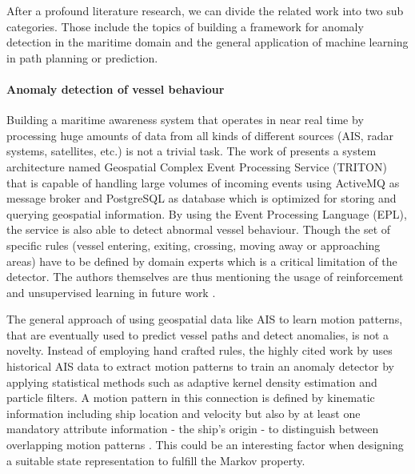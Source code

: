 After a profound literature research, we can divide the related work into two sub categories. Those include the topics of building a framework for anomaly detection in the maritime domain and the general application of machine learning in path planning or prediction.

\par 
\paragraph{Anomaly detection of vessel behaviour}
Building a maritime awareness system that operates in near real time by processing huge amounts of data from all kinds of different sources (AIS, radar systems, satellites, etc.) is not a trivial task. The work of \cite{tsogas2019geospatial} presents a system architecture named Geospatial Complex Event Processing Service (TRITON) that is capable of handling large volumes of incoming events using ActiveMQ as message broker and PostgreSQL as database which is optimized for storing and querying geospatial information. By using the Event Processing Language (EPL), the service is also able to detect abnormal vessel behaviour. Though the set of specific rules (vessel entering, exiting, crossing, moving away or approaching areas) have to be defined by domain experts \cite[p.~4]{tsogas2019geospatial} which is a critical limitation of the detector. The authors themselves are thus mentioning the usage of reinforcement and unsupervised learning in future work \cite[p.~9]{tsogas2019geospatial}.
\par 
The general approach of using geospatial data like AIS to learn motion patterns, that are eventually used to predict vessel paths and detect anomalies, is not a novelty. Instead of employing hand crafted rules, the highly cited work by \cite{ristic2008statistical} uses historical AIS data to extract motion patterns to train an anomaly detector by applying statistical methods such as adaptive kernel density estimation and particle filters. A motion pattern in this connection is defined by kinematic information including ship location and velocity but also by at least one mandatory attribute information - the ship's origin - to distinguish between overlapping motion patterns \cite[p.~2]{ristic2008statistical}. This could be an interesting factor when designing a suitable state representation to fulfill the Markov property.
